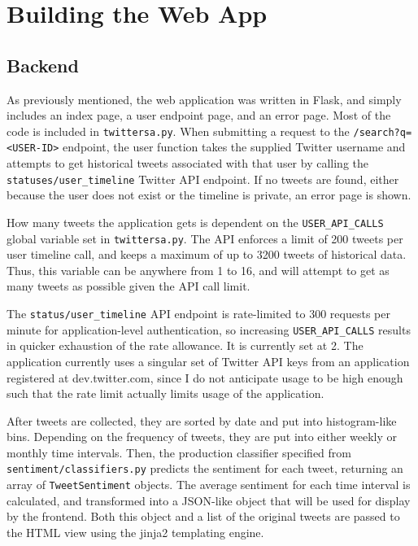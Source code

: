 \documentclass[letter,12pt]{article}
\begin{document}
\section{Building the Web App}
\label{sec:web}

\subsection{Backend}

As previously mentioned, the web application was written in
Flask, and simply includes an index page, a user endpoint page, and an error
page. Most of the code is included in \texttt{twittersa.py}. When submitting a
request to the \texttt{/search?q=<USER-ID>} endpoint, the user function takes
the supplied Twitter username and attempts to get historical tweets associated
with that user by calling the \texttt{statuses/user\_timeline} Twitter API
endpoint. If no tweets are found, either because the user does not exist or the
timeline is private, an error page is shown.

How many tweets the application gets is dependent on the
\texttt{USER\_API\_CALLS} global variable set in \texttt{twittersa.py}. The API
enforces a limit of 200 tweets per user timeline call, and keeps a maximum
of up to 3200 tweets of historical data. Thus, this variable can be anywhere
from 1 to 16, and will attempt to get as many tweets as possible given the API
call limit.

The \texttt{status/user\_timeline} API endpoint is rate-limited to 300 requests
per minute for application-level authentication, so increasing
\texttt{USER\_API\_CALLS} results in quicker exhaustion of the rate allowance.
It is currently set at 2. The application currently uses a singular set of
Twitter API keys from an application registered at dev.twitter.com, since I do
not anticipate usage to be high enough such that the rate limit actually limits
usage of the application.

After tweets are collected, they are sorted by date and put into histogram-like
bins. Depending on the frequency of tweets, they are put into either weekly or
monthly time intervals. Then, the production classifier specified from
\texttt{sentiment/classifiers.py} predicts the sentiment for each tweet,
returning an array of \texttt{TweetSentiment} objects. The average sentiment
for each time interval is calculated, and transformed into a JSON-like object
that will be used for display by the frontend. Both this object and a list of
the original tweets are passed to the HTML view using the jinja2 templating
engine.
\end{document}
